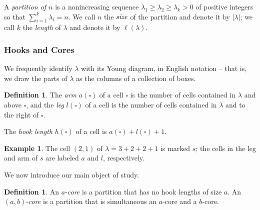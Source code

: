 \documentclass{amsart}[12pt]
\theoremstyle{definition}
\newtheorem{example}[dummy]{Example}
\newtheorem{definition}[dummy]{Definition}
\begin{document}
A \emph{partition of $n$} is a nonincreasing sequence $\lambda_1\geq \lambda_2\geq
\lambda_{k}> 0$ of positive integers so that $\sum_{i=1}^k \lambda_i=n$.  We
call $n$ the $\emph{size}$ of the partition and denote it by $|\lambda|$; we call
$k$ the \emph{length} of $\lambda$ and denote it by $\ell(\lambda)$.

\subsubsection{Hooks and Cores}


We frequently identify $\lambda$ with its Young diagram, in
English notation -- that is, we draw the parts of $\lambda$ as
the columns of a collection of boxes.

\begin{definition}
The \emph{arm} $a(\square)$ of a cell $\square$ is the number of cells contained in $\lambda$ and above  $\square$, and the \emph{leg} $l(\square)$ of a cell is the number of cells contained in $\lambda$ and to the right of $\square$.

The \emph{hook length} $h(\square)$ of a cell is $a(\square)+l(\square)+1$.
\end{definition}

\begin{example}
The cell $(2,1)$ of $\lambda=3+2+2+1$ is marked $s$; the cells in the
leg and arm of $s$ are labeled $a$ and $l$, respectively.
\begin{center}
\end{center}

\end{example}

We now introduce our main object of study.
\begin{definition}
An $a$-\emph{core} is a partition that has no hook lengths of size $a$.  An $(a,b)$-\emph{core} is a partition that is simultaneous an $a$-core and a $b$-core.

\end{definition}
\end{document}
